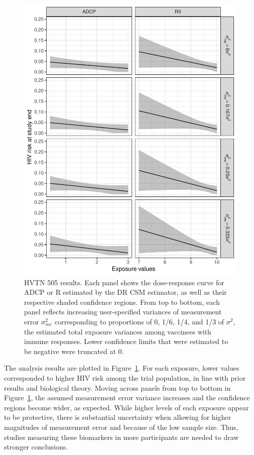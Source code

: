 \documentclass[useAMS,usenatbib,referee]{biom}
\newcommand{\RNum}[1]{\uppercase\expandafter{\romannumeral #1\relax}}
\begin{document}
\begin{figure}[h!]
\centering
\includegraphics[width=5.6in]{fig3-linear2.pdf}
\caption{HVTN 505 results. Each panel shows the dose-response curve for ADCP or R\RNum{2} estimated by the DR CSM estimator, as well as their respective shaded confidence regions. From top to bottom, each panel reflects increasing user-specified variances of measurement error $\sigma^{2}_{me}$ corresponding to proportions of 0, 1/6, 1/4, and 1/3 of $\sigma^{2}$, the estimated total exposure variances among vaccinees with immune responses. Lower confidence limits that were estimated to be negative were truncated at 0.}
\label{fig:three}
\end{figure}

The analysis results are plotted in Figure~\ref{fig:three}. For each exposure, lower values corresponded to higher HIV risk among the trial population, in line with prior results and biological theory. Moving across panels from top to bottom in Figure~\ref{fig:three}, the assumed measurement error variance increases and the confidence regions become wider, as expected. While higher levels of each exposure appear to be protective, there is substantial uncertainty when allowing for higher magnitudes of measurement error and because of the low sample size. Thus, studies measuring these biomarkers in more participants are needed to draw stronger conclusions.
\end{document}
